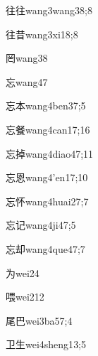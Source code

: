 \begin{verbete}{往往}{wang3wang3}{8;8}
\end{verbete}
\begin{verbete}{往昔}{wang3xi1}{8;8}
\end{verbete}
\begin{verbete}{罔}{wang3}{8}
\end{verbete}
\begin{verbete}{忘}{wang4}{7}
\end{verbete}
\begin{verbete}{忘本}{wang4ben3}{7;5}
\end{verbete}
\begin{verbete}{忘餐}{wang4can1}{7;16}
\end{verbete}
\begin{verbete}{忘掉}{wang4diao4}{7;11}
\end{verbete}
\begin{verbete}{忘恩}{wang4'en1}{7;10}
\end{verbete}
\begin{verbete}{忘怀}{wang4huai2}{7;7}
\end{verbete}
\begin{verbete}{忘记}{wang4ji4}{7;5}
\end{verbete}
\begin{verbete}{忘却}{wang4que4}{7;7}
\end{verbete}
\begin{verbete}{为}{wei2}{4}
\end{verbete}
\begin{verbete}{喂}{wei2}{12}
\end{verbete}
\begin{verbete}{尾巴}{wei3ba5}{7;4}
\end{verbete}
\begin{verbete}{卫生}{wei4sheng1}{3;5}
\end{verbete}
